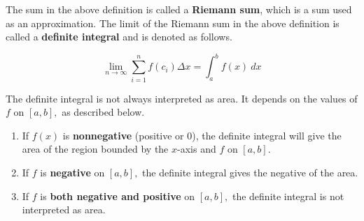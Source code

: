 \documentclass{ximera}
\begin{document}
The sum in the above definition is called a \textbf{Riemann sum}, which is a sum used as an approximation.  
The limit of the Riemann sum in the above definition is called a \textbf{definite integral} and is denoted as follows.

\[   \lim_{n \rightarrow \infty} \sum_{i=1}^{n} f(c_i) \Delta x = \int_{a}^{b} f(x) \ dx     \]


\begin{remark}
The definite integral is not always interpreted as area.  It depends on the values of $f$ on $[a,b],$ as described below.

\begin{enumerate}
\item If $f(x)$ is \textbf{nonnegative} (positive or 0), the definite integral will give the area of the region bounded by the $x$-axis and $f$ 
 on $[a, b].$

\item If $f$ is \textbf{negative} on $[a, b],$ the definite integral gives the negative of
the area.

\item If $f$ is \textbf{both negative and positive} on $[a, b],$ the definite integral is not interpreted
as area.
\end{enumerate}
\end{remark}
\end{document}
